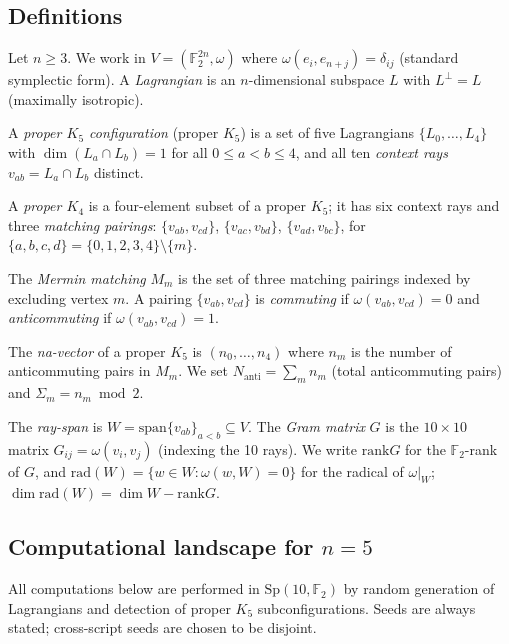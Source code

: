 \documentclass[11pt,a4paper]{article}
\theoremstyle{remark}
\newcommand{\Sp}{\mathrm{Sp}}
\newcommand{\rad}{\mathrm{rad}}
\newcommand{\rank}{\mathrm{rank}}
\newcommand{\Nanti}{N_{\mathrm{anti}}}
\begin{document}
\subsection{Definitions}

Let $n\ge3$.  We work in $V=(\mathbb F_2^{2n},\omega)$ where
$\omega(e_i,e_{n+j})=\delta_{ij}$ (standard symplectic form).
A \emph{Lagrangian} is an $n$-dimensional subspace $L$ with $L^\perp=L$
(maximally isotropic).

A \emph{proper $K_5$ configuration} (proper $K_5$) is a set of five Lagrangians
$\{L_0,\ldots,L_4\}$ with $\dim(L_a\cap L_b)=1$ for all $0\le a<b\le4$, and all
ten \emph{context rays} $v_{ab}=L_a\cap L_b$ distinct.

A \emph{proper $K_4$} is a four-element subset of a proper $K_5$; it has six context
rays and three \emph{matching pairings}: $\{v_{ab},v_{cd}\}$, $\{v_{ac},v_{bd}\}$,
$\{v_{ad},v_{bc}\}$, for $\{a,b,c,d\}=\{0,1,2,3,4\}\setminus\{m\}$.

The \emph{Mermin matching} $M_m$ is the set of three matching pairings indexed by
excluding vertex $m$.  A pairing $\{v_{ab},v_{cd}\}$ is \emph{commuting} if
$\omega(v_{ab},v_{cd})=0$ and \emph{anticommuting} if $\omega(v_{ab},v_{cd})=1$.

The \emph{na-vector} of a proper $K_5$ is $(n_0,\ldots,n_4)$ where $n_m$ is the
number of anticommuting pairs in $M_m$.  We set $\Nanti=\sum_m n_m$ (total
anticommuting pairs) and $\Sigma_m=n_m\bmod2$.

The \emph{ray-span} is $W=\mathrm{span}\{v_{ab}\}_{a<b}\subseteq V$.
The \emph{Gram matrix} $G$ is the $10\times10$ matrix $G_{ij}=\omega(v_i,v_j)$
(indexing the 10 rays).
We write $\rank G$ for the $\mathbb F_2$-rank of $G$, and
$\rad(W)=\{w\in W:\omega(w,W)=0\}$ for the radical of $\omega|_W$;
$\dim\rad(W)=\dim W-\rank G$.

\subsection{\texorpdfstring{Computational landscape for $n=5$}{Computational landscape for n=5}}

All computations below are performed in $\Sp(10,\mathbb F_2)$ by random generation
of Lagrangians and detection of proper $K_5$ subconfigurations.
Seeds are always stated; cross-script seeds are chosen to be disjoint.
\end{document}
